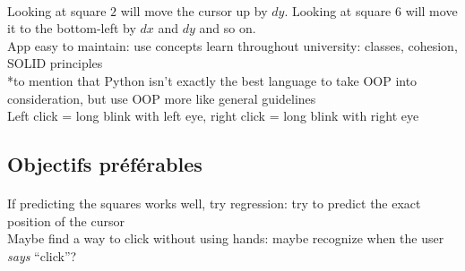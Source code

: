 \paragraph{}
Looking at square $2$ will move the cursor up by $dy$. Looking at square $6$ will move it to the bottom-left by $dx$ and $dy$ and so on.
\\

App easy to maintain: use concepts learn throughout university: classes, cohesion, SOLID principles\\
*to mention that Python isn't exactly the best language to take OOP into consideration, but use OOP more like general guidelines
\\

Left click = long blink with left eye, right click = long blink with right eye


\subsection{Objectifs préférables}
\paragraph{}
If predicting the squares works well, try regression: try to predict the exact position of the cursor
\\

Maybe find a way to click without using hands: maybe recognize when the user \emph{says} ``click''?
\\